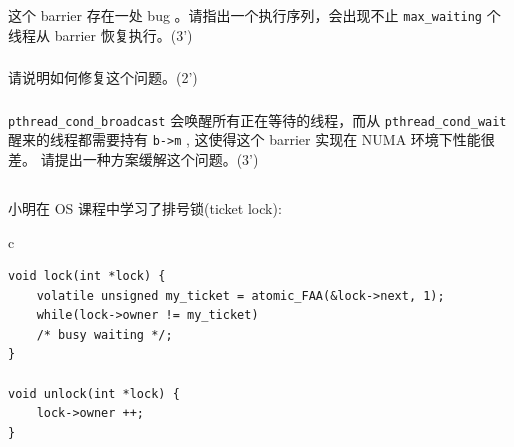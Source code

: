 \documentclass[a4paper,12pt]{article}
\newcommand{\score}[1]{(#1')}
\begin{document}
\subsubsection{}

这个 barrier 存在一处 bug 。请指出一个执行序列，会出现不止 \verb|max_waiting| 个线程从 barrier 恢复执行。\score{3}

\begin{answer}
  \lipsum[3]
\end{answer}

\subsubsection{}

请说明如何修复这个问题。\score{2}

\begin{answer}
  \lipsum[3]
\end{answer}

\subsubsection{}

\verb|pthread_cond_broadcast| 会唤醒所有正在等待的线程，而从 \verb|pthread_cond_wait| 醒来的线程都需要持有 \verb|b->m| , 这使得这个 barrier 实现在 NUMA 环境下性能很差。
请提出一种方案缓解这个问题。\score{3}

\begin{answer}
  \lipsum[3]
\end{answer}

\subsection{}

小明在 OS 课程中学习了排号锁(ticket lock):

\begin{table}[htb]
  \centering
  \begin{tabular}{c}
    \begin{lstlisting}
void lock(int *lock) {
    volatile unsigned my_ticket = atomic_FAA(&lock->next, 1);
    while(lock->owner != my_ticket)
	/* busy waiting */;
}

void unlock(int *lock) {
    lock->owner ++;
}
    \end{lstlisting}
  \end{tabular}
\end{table}

\subsubsection{}
\end{document}
